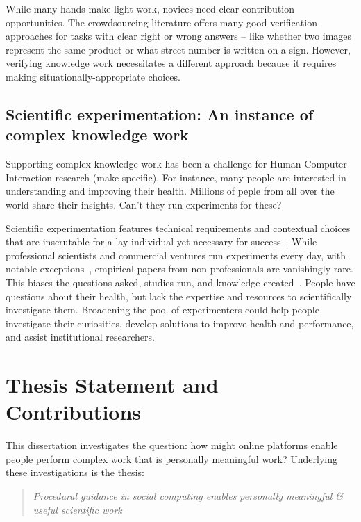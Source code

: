 While many hands make light work, novices need clear contribution opportunities. 
The crowdsourcing literature offers many good verification approaches for tasks 
with clear right or wrong answers – like whether two images represent the same 
product or what street number is written on a sign. However, verifying knowledge
 work necessitates a different approach because it requires making 
situationally-appropriate choices. 

\subsection{Scientific experimentation: An instance of complex knowledge work}
Supporting complex knowledge work has been a challenge for Human Computer Interaction
 research (make specific). For instance, many people are interested in understanding and 
improving their health. Millions of peple from all over the world share their insights. 
Can't they run experiments for these?

Scientific experimentation features technical requirements and contextual choices 
that are inscrutable for a lay individual yet necessary for success~\cite{Martin2007}. While 
professional scientists and commercial ventures run experiments every day, with 
notable exceptions~\cite{Cooper2010,DanaLewis}, empirical papers from non-professionals are 
vanishingly rare. This biases the questions asked, studies run, and knowledge 
created~\cite{Henrich2010a}. People have questions about their health, but lack the expertise 
and resources to scientifically investigate them. Broadening the pool of 
experimenters could help people investigate their curiosities, develop solutions 
to improve health and performance, and assist institutional researchers.

\section{Thesis Statement and Contributions}
This dissertation investigates the question: how might online platforms enable people perform 
complex work that is personally meaningful work? Underlying these investigations is the thesis:
\begin{quote}
\emph{Procedural guidance in social computing enables personally meaningful \& useful scientific work}
\end{quote}

